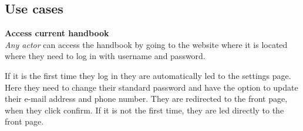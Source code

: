 \subsection{Use cases} \label{sec:usecases}

\textbf{Access current handbook}
\\
\textit{Any actor} can access the handbook by going to the website where it is located where they need to log in with username and password.

If it is the first time they log in they are automatically led to the settings page.
Here they need to change their standard password and have the option to update their e-mail address and phone number.
They are redirected to the front page, when they click confirm.
If it is not the first time, they are led directly to the front page.

